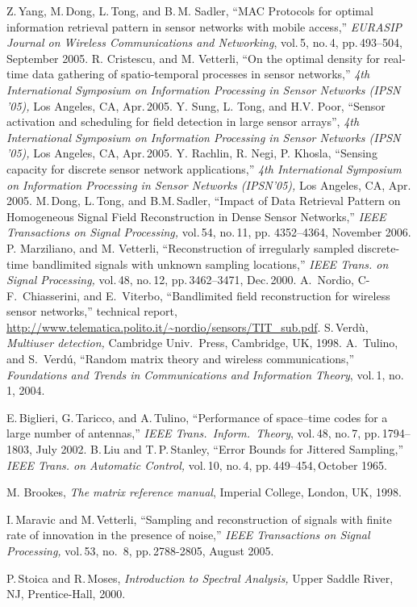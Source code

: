 \documentclass[final, a4paper]{IEEEtran}
\begin{document}
\begin{thebibliography}{99}
 Z.\,Yang, M.\,Dong, L.\,Tong, and B.\,M. Sadler,
``MAC Protocols for optimal information retrieval pattern in sensor networks with mobile access,''
{\em EURASIP Journal on Wireless Communications and Networking},
vol.\,5, no.\,4, pp.\,493--504, September 2005.
 R. Cristescu, and M. Vetterli,
``On the optimal density for real-time data gathering of spatio-temporal
processes in sensor networks,''
{\em 4th International Symposium on Information Processing in Sensor Networks (IPSN '05),}
Los Angeles, CA, Apr.\,2005.
 Y. Sung, L. Tong, and H.V. Poor,
``Sensor activation and scheduling for field detection in large sensor arrays'',
{\em 4th International Symposium on Information Processing in Sensor Networks (IPSN '05),}
Los Angeles, CA, Apr.\,2005.
 Y. Rachlin, R. Negi, P. Khosla,
``Sensing capacity for discrete sensor network applications,''
{\em 4th International Symposium on Information Processing in
Sensor Networks (IPSN'05),}  Los Angeles, CA, Apr.\,2005.
M.\,Dong, L.\,Tong, and B.M.\,Sadler,
``Impact of Data Retrieval Pattern on Homogeneous Signal Field Reconstruction in Dense Sensor Networks,''
{\em IEEE Transactions on Signal Processing,} vol.\,54, no.\,11, pp. 4352--4364, November 2006.
 P. Marziliano, and M. Vetterli, ``Reconstruction of
irregularly sampled discrete-time bandlimited signals with unknown sampling locations,''
{\em IEEE  Trans. on Signal Processing,} vol.\,48, no.\,12, pp.\,3462--3471, Dec.\,2000.
A.\ Nordio, C-F.\ Chiasserini, and E.\ Viterbo,
``Bandlimited field reconstruction for wireless sensor networks,''
technical report,
\url{http://www.telematica.polito.it/~nordio/sensors/TIT_sub.pdf}.
 S.\,Verd\`u, {\em Multiuser detection,}
Cambridge Univ.\ Press, Cambridge, UK, 1998.
 A.\ Tulino, and S.\ Verd\'u, ``Random matrix theory and
wireless communications,'' {\em Foundations and Trends in Communications and
Information Theory}, vol.\,1, no.\,1, 2004.

 E.\,Biglieri, G.\,Taricco, and A.\,Tulino, ``Performance of
space--time codes for a large number of antennas,'' {\em IEEE Trans.\ Inform.\
Theory}, vol.\,48, no.\,7, pp.\,1794--1803, July 2002.
B.\,Liu and T.\,P.\,Stanley,
``Error Bounds for Jittered Sampling,''
{\it IEEE Trans. on Automatic Control,} vol.\,10, no.\,4, pp.\,449--454,\,October 1965.


 M. Brookes, {\em The matrix reference manual},
Imperial College, London, UK, 1998.

I.\,Maravic and M.\,Vetterli, ``Sampling and reconstruction of signals
with finite rate of innovation in the presence of noise,'' {\em IEEE
Transactions on Signal Processing,} vol.\,53, no. \,8, pp.\,2788-2805,
August 2005.

P.\,Stoica and R.\,Moses, {\em Introduction to Spectral Analysis,}
Upper Saddle River, NJ, Prentice-Hall, 2000.


\end{thebibliography}
\end{document}
